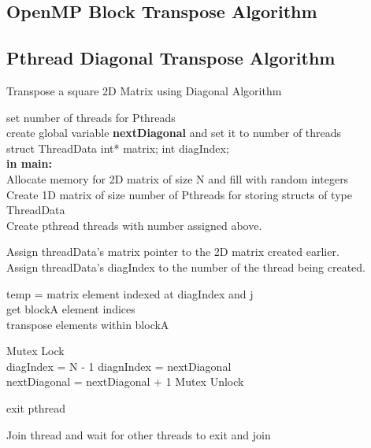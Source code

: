 \documentclass[10pt,onecolumn]{article}
\begin{document}
\subsection{OpenMP Block Transpose Algorithm}
%

%
\subsection{Pthread Diagonal Transpose Algorithm}
%
\begin{algorithm}[H]
    \caption{Transpose a square 2D Matrix using Diagonal Algorithm}
    set number of threads for Pthreads\\
    create global variable \textbf{nextDiagonal} and set it to number of threads \\
    struct ThreadData{ int* matrix; int diagIndex;} \\
    
    \textbf{in main:} \\
    Allocate memory for 2D matrix of size N and fill with random integers \\
    Create 1D matrix of size number of Pthreads for storing structs of type ThreadData \\
    Create pthread threads with number assigned above.\\
    
    {   
        Assign threadData's matrix pointer to the 2D matrix created earlier.\\
        Assign threadData's diagIndex to the number of the thread being created.\\
        {
            {
                temp = matrix element indexed at diagIndex and j \\
                get blockA element indices\\
                transpose elements within blockA\\
            }
            
            Mutex Lock\\
             {diagIndex = N - 1}
            \Else
            { 
                diagnIndex = nextDiagonal \\
                nextDiagonal = nextDiagonal + 1
            }
            Mutex Unlock\\
            
        }
        exit pthread
    }
    
    {
        Join thread and wait for other threads to exit and join
    }
\end{algorithm}
%
\end{document}
